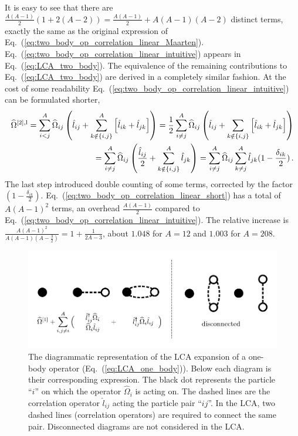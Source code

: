 \documentclass[10pt]{article}
\begin{document}
It is easy to see that there are $\frac{A(A-1)}{2}(1 + 2(A-2)) = \frac{A(A-1)}{2} + A(A-1)(A-2)$ distinct terms, exactly the same as the original expression of Eq.~(\ref{eq:two_body_op_correlation_linear_Maarten}).
Eq.~(\ref{eq:two_body_op_correlation_linear_intuitive}) appears in Eq.~(\ref{eq:LCA_two_body}). The equivalence of the remaining contributions to Eq.~(\ref{eq:LCA_two_body}) are derived in a completely similar fashion.
At the cost of some readability Eq.~(\ref{eq:two_body_op_correlation_linear_intuitive}) can be formulated shorter,
\begin{align}
	\widehat{\Omega}^{[2],\text{l}} =
	\sum_{i<j}^{A} \widehat{\Omega}_{ij}  \left( \hat{l}_{ij} + 
	\sum_{k \notin\{i,j\}}^{A}
	\left[ 
	\hat{l}_{ik} + \hat{l}_{jk} 
	\right]	
	\right) = \frac{1}{2}\sum_{i \neq j}^{A} \widehat{\Omega}_{ij}  \left( \hat{l}_{ij} + 
	\sum_{k \notin\{i,j\}}
	\left[ 
	\hat{l}_{ik} + \hat{l}_{jk} 
	\right]	
	\right) \notag \\
	= \sum_{i \neq j}^{A} \widehat{\Omega}_{ij}  \left( \frac{\hat{l}_{ij}}{2} + 
	\sum_{k \notin\{i,j\}}^{A} \hat{l}_{jk}
	\right) =
	\sum_{i \neq j}^{A} \widehat{\Omega}_{ij} 
	\sum_{k \neq j}^{A} \hat{l}_{jk} ( 1 - \frac{\delta_{ik}}{2}) \, .
	\label{eq:two_body_op_correlation_linear_short}
\end{align}
The last step introduced double counting of some terms, corrected by the factor $( 1 - \frac{\delta_{ik}}{2})$. Eq.~(\ref{eq:two_body_op_correlation_linear_short}) has a total of $A(A-1)^{2}$ terms, an overhead $\frac{A(A-1)}{2}$ compared to Eq.~(\ref{eq:two_body_op_correlation_linear_intuitive}). The relative increase is $ \frac{A(A-1)^{2}}{A(A-1)(A-\frac{3}{2})} = 1 + \frac{1}{2A-3}$, about $1.048$ for $A=12$ and $1.003$ for $A=208$.
\begin{figure}
\centering
\includegraphics[scale=0.75]{figures/one_body_with_eq.pdf}
\caption{
The diagrammatic representation of the LCA expansion of a one-body operator (Eq.~(\ref{eq:LCA_one_body})).
Below each diagram is their corresponding expression.
The black dot represents the particle ``$i$'' on which the operator $\widehat{\Omega}_{i}$ is acting on.
The dashed lines are the correlation operator $\hat{l}_{ij}$ acting the particle pair ``$ij$''.
In the LCA, two dashed lines (correlation operators) are required to connect the same pair.
Disconnected diagrams are not considered in the LCA.
} 
\label{fig:LCA_one_body_diagram}
\end{figure}
\end{document}
